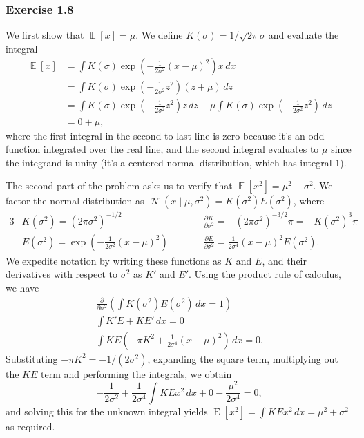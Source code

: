 \documentclass[12pt, a4paper]{article}
\DeclareMathOperator{\N}{\mathcal{N}}
\DeclareMathOperator{\E}{\mathbb{E}}
\begin{document}
\subsubsection*{Exercise 1.8}
We first show that $\E \left[x\right] = \mu$.
We define $K(\sigma) = 1 / \sqrt{2 \pi} \sigma$ and evaluate the integral
\begin{align*}
	\E \left[x\right] &= \int K(\sigma) \exp \left( - \frac{1}{2 \sigma^2} \left(x - \mu \right)^2 \right) x \, dx \\
	&= \int K(\sigma) \exp \left( - \frac{1}{2 \sigma^2} z^2 \right) (z + \mu) \, dz \tag{change of variables}\\
	&= \int K(\sigma) \exp \left( - \frac{1}{2 \sigma^2} z^2 \right) z \, dz 
	+
	 \mu \int K(\sigma) \exp \left( - \frac{1}{2 \sigma^2} z^2 \right) \, dz \\
	 & = 0 + \mu,
\end{align*}
where the first integral in the second to last line is zero because it's an odd function integrated over the real line, and the second integral evaluates to $\mu$ since the integrand is unity (it's a centered normal distribution, which has integral $1$).

The second part of the problem asks us to verify that $\E \left[ x^2 \right] = \mu^2 + \sigma^2$.
We factor the normal distribution as $\N\left( x \mid \mu, \sigma^2\right) = K(\sigma^2) E(\sigma^2)$, where
\begin{alignat*}{3}
	& K(\sigma^2) = \left( 2 \pi \sigma^2 \right)^{-1/2} 
	&& \qquad \frac{\partial K}{\partial \sigma^2} = - \left( 2 \pi \sigma^2 \right)^{-3/2} \pi = -K(\sigma^2)^3 \pi \\
	& E(\sigma^2) = \exp \left( - \frac{1}{2 \sigma^2} \left( x - \mu \right)^2 \right)
	&& \qquad \frac{\partial E}{\partial \sigma^2} = \frac{1}{2\sigma^4} \left( x - \mu\right)^2 E(\sigma^2).
\end{alignat*}
We expedite notation by writing these functions as $K$ and $E$, and their derivatives with respect to $\sigma^2$ as $K'$ and $E'$.
Using the product rule of calculus, we have
\begin{gather*}
	\frac{\partial}{\partial \sigma^2} \left( \int K(\sigma^2) E(\sigma^2) \, dx = 1 \right) \\
	\int K' E + K E' \, dx = 0 \\
	\int KE \left( -\pi K^2 + \frac{1}{2 \sigma^4} (x - \mu)^2 \right) \, dx = 0.
\end{gather*}
Substituting $- \pi K^2 = - 1 / (2 \sigma^2)$, expanding the square term, multiplying out the $KE$ term and performing the integrals, we obtain
\begin{equation*}
	-\frac{1}{2\sigma^2} + \frac{1}{2 \sigma^4} \int KE x^2 \, dx + 0 - \frac{\mu^2}{2 \sigma^4} = 0,
\end{equation*}
and solving this for the unknown integral yields $\operatorname{E}\left[x^2\right] = \int KE x^2 \, dx = \mu^2 + \sigma^2$
as required.
\end{document}

